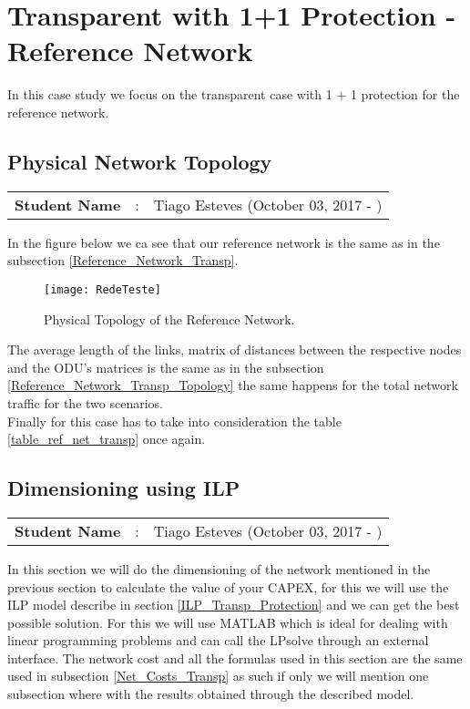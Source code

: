 \clearpage

\section{Transparent with 1+1 Protection - Reference Network}
In this case study we focus on the transparent case with 1 + 1 protection for the reference network.

\subsection{Physical Network Topology}
\begin{tcolorbox}	
\begin{tabular}{p{2.75cm} p{0.2cm} p{10.5cm}} 	
\textbf{Student Name}  &:& Tiago Esteves    (October 03, 2017 - )\\
\end{tabular}
\end{tcolorbox}

In the figure below we ca see that our reference network is the same as in the subsection \ref{Reference_Network_Transp}.

\begin{figure}[h!]
\centering
\texttt{[image: RedeTeste]}
\caption{Physical Topology of the Reference Network.}
\end{figure}

The average length of the links, matrix of distances between the respective nodes and the ODU's matrices is the same as in the subsection \ref{Reference_Network_Transp_Topology} the same happens for the total network traffic for the two scenarios.\\

Finally for this case has to take into consideration the table \ref{table_ref_net_transp} once again.


\subsection{Dimensioning using ILP}
\begin{tcolorbox}	
\begin{tabular}{p{2.75cm} p{0.2cm} p{10.5cm}} 	
\textbf{Student Name}  &:& Tiago Esteves    (October 03, 2017 - )\\
\end{tabular}
\end{tcolorbox}


In this section we will do the dimensioning of the network mentioned in the previous section to calculate the value of your CAPEX, for this we will use the ILP model describe in section \ref{ILP_Transp_Protection} and we can get the best possible solution.
For this we will use MATLAB which is ideal for dealing with linear programming problems and can call the LPsolve through an external interface.
The network cost and all the formulas used in this section are the same used in subsection \ref{Net_Costs_Transp} as such if only we will mention one subsection where with the results obtained through the described model.\\


